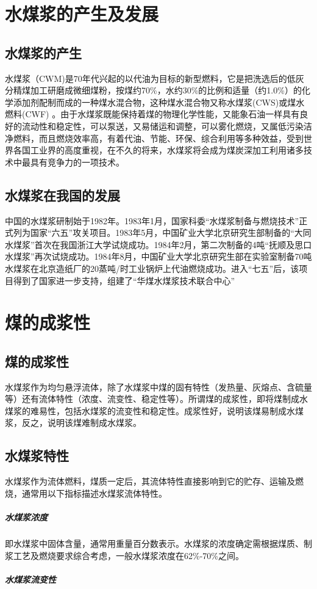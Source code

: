 \documentclass[10pt,openany]{ctexbook}
\begin{document}
\section{水煤浆的产生及发展}
\subsection{水煤浆的产生}
水煤浆（CWM)是70年代兴起的以代油为目标的新型燃料，它是把洗选后的低灰分精煤加工研磨成微细煤粉，按煤约70\%，水约30\%的比例和适量（约1.0\%）的化学添加剂配制而成的一种煤水混合物，这种煤水混合物又称水煤浆(CWS)或煤水燃料(CWF) 。由于水煤浆既能保持着煤的物理化学性能，又能象石油一样具有良好的流动性和稳定性，可以泵送，又易储运和调整，可以雾化燃烧，又属低污染洁净燃料，而且燃烧效率高，有着代油、节能、环保、综合利用等多种效益，受到世界各国工业界的高度重视，在不久的将来，水煤浆将会成为煤炭深加工利用诸多技术中最具有竞争力的一项技术。
\subsection{水煤浆在我国的发展}
中国的水煤浆研制始于1982年。1983年1月，国家科委“水煤浆制备与燃烧技术”正式列为国家“六五”攻关项目。1983年5月，中国矿业大学北京研究生部制备的“大同水煤浆”首次在我国浙江大学试烧成功。1984年2月，第二次制备的4吨“抚顺及思口水煤浆”再次试烧成功。1984年8月，中国矿业大学北京研究生部在实验室制备70吨水煤浆在北京造纸厂的20蒸吨/时工业锅炉上代油燃烧成功。进入“七五”后，该项目得到了国家进一步支持，组建了“华煤水煤浆技术联合中心”
\section{煤的成浆性}
\subsection{煤的成浆性}
水煤浆作为均匀悬浮流体，除了水煤浆中煤的固有特性（发热量、灰熔点、含硫量等）还有流体特性（浓度、流变性、稳定性等）。所谓煤的成浆性，即将煤制成水煤浆的难易性，包括水煤浆的流变性和稳定性。成浆性好，说明该煤易制成水煤浆，反之，说明该煤难制成水煤浆。
\subsection{水煤浆特性}
水煤浆作为流体燃料，煤质一定后，其流体特性直接影响到它的贮存、运输及燃烧，通常用以下指标描述水煤浆流体特性。
 \subparagraph{水煤浆浓度}  即水煤浆中固体含量，通常用重量百分数表示。水煤浆的浓度确定需根据煤质、制浆工艺及燃烧要求综合考虑，一般水煤浆浓度在62\%-70\%之间。
 \subparagraph{水煤浆流变性}
\end{document}
